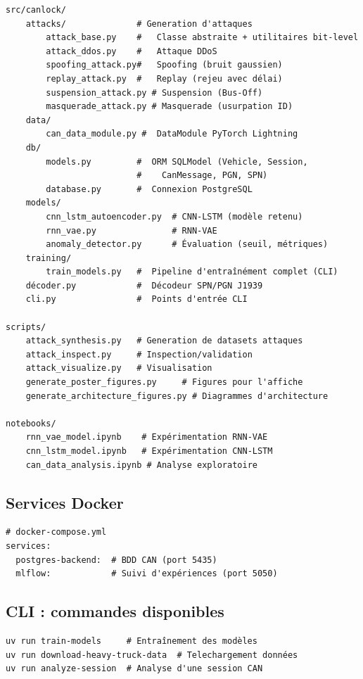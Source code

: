\documentclass[12pt,a4paper]{article}
\begin{document}
\begin{verbatim}
src/canlock/
    attacks/              # Generation d'attaques
        attack_base.py    #   Classe abstraite + utilitaires bit-level
        attack_ddos.py    #   Attaque DDoS
        spoofing_attack.py#   Spoofing (bruit gaussien)
        replay_attack.py  #   Replay (rejeu avec délai)
        suspension_attack.py # Suspension (Bus-Off)
        masquerade_attack.py # Masquerade (usurpation ID)
    data/
        can_data_module.py #  DataModule PyTorch Lightning
    db/
        models.py         #  ORM SQLModel (Vehicle, Session,
                          #    CanMessage, PGN, SPN)
        database.py       #  Connexion PostgreSQL
    models/
        cnn_lstm_autoencoder.py  # CNN-LSTM (modèle retenu)
        rnn_vae.py               # RNN-VAE
        anomaly_detector.py      # Évaluation (seuil, métriques)
    training/
        train_models.py   #  Pipeline d'entraînément complet (CLI)
    décoder.py            #  Décodeur SPN/PGN J1939
    cli.py                #  Points d'entrée CLI

scripts/
    attack_synthesis.py   # Generation de datasets attaques
    attack_inspect.py     # Inspection/validation
    attack_visualize.py   # Visualisation
    generate_poster_figures.py     # Figures pour l'affiche
    generate_architecture_figures.py # Diagrammes d'architecture

notebooks/
    rnn_vae_model.ipynb    # Expérimentation RNN-VAE
    cnn_lstm_model.ipynb   # Expérimentation CNN-LSTM
    can_data_analysis.ipynb # Analyse exploratoire
\end{verbatim}

\subsection{Services Docker}

\begin{lstlisting}[basicstyle=\ttfamily\small, breaklines=true]
# docker-compose.yml
services:
  postgres-backend:  # BDD CAN (port 5435)
  mlflow:            # Suivi d'expériences (port 5050)
\end{lstlisting}

\subsection{CLI : commandes disponibles}

\begin{lstlisting}[basicstyle=\ttfamily\small, breaklines=true]
uv run train-models     # Entraînement des modèles
uv run download-heavy-truck-data  # Telechargement données
uv run analyze-session  # Analyse d'une session CAN
\end{lstlisting}
\end{document}

